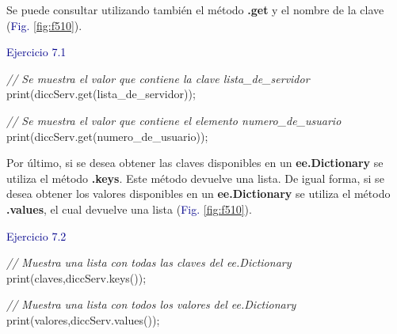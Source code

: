\documentclass[
  12pt,
  letterpaper,
  twoside]{book}
\newenvironment{Shaded}{\begin{snugshade}}{\end{snugshade}}
\newcommand{\CommentTok}[1]{\textcolor[rgb]{0.24,0.58,0.00}{\textit{#1}}}
\newcommand{\FunctionTok}[1]{\textcolor[rgb]{0.48,0.12,0.64}{#1}}
\newcommand{\NormalTok}[1]{#1}
\newcommand{\OperatorTok}[1]{\textcolor[rgb]{0.00,0.00,0.00}{#1}}
\newcommand{\StringTok}[1]{\textcolor[rgb]{0.87,0.29,0.22}{#1}}
\newcommand\boldpurple[1]{\textcolor{darkpurple}{\textbf{#1}}}
\begin{document}
Se puede consultar utilizando también el método \boldpurple{.get} y el nombre de la clave (\textcolor{darkblue}{Fig.} \ref{fig:f510}).

\textcolor{darkblue}{Ejercicio 7.1}

\begin{Shaded}
\begin{Highlighting}[]
\CommentTok{// Se muestra el valor que contiene la clave \textquotesingle{}lista\_de\_servidor\textquotesingle{}}
\FunctionTok{print}\NormalTok{(diccServ}\OperatorTok{.}\FunctionTok{get}\NormalTok{(}\StringTok{\textquotesingle{}lista\_de\_servidor\textquotesingle{}}\NormalTok{))}\OperatorTok{;}

\CommentTok{// Se muestra el valor que contiene el elemento \textquotesingle{}numero\_de\_usuario   }
\FunctionTok{print}\NormalTok{(diccServ}\OperatorTok{.}\FunctionTok{get}\NormalTok{(}\StringTok{\textquotesingle{}numero\_de\_usuario\textquotesingle{}}\NormalTok{))}\OperatorTok{;}        
\end{Highlighting}
\end{Shaded}

Por último, si se desea obtener las claves disponibles en un \boldpurple{ee.Dictionary} se utiliza el método \boldpurple{.keys}. Este método devuelve una lista. De igual forma, si se desea obtener los valores disponibles en un \boldpurple{ee.Dictionary} se utiliza el método \boldpurple{.values}, el cual devuelve una lista (\textcolor{darkblue}{Fig.} \ref{fig:f510}).

\textcolor{darkblue}{Ejercicio 7.2}

\begin{Shaded}
\begin{Highlighting}[]
\CommentTok{// Muestra una lista con todas las claves del ee.Dictionary}
\FunctionTok{print}\NormalTok{(}\StringTok{\textquotesingle{}claves\textquotesingle{}}\OperatorTok{,}\NormalTok{diccServ}\OperatorTok{.}\FunctionTok{keys}\NormalTok{())}\OperatorTok{;}    

\CommentTok{// Muestra una lista con todos los valores del ee.Dictionary}
\FunctionTok{print}\NormalTok{(}\StringTok{\textquotesingle{}valores\textquotesingle{}}\OperatorTok{,}\NormalTok{diccServ}\OperatorTok{.}\FunctionTok{values}\NormalTok{())}\OperatorTok{;}  
\end{Highlighting}
\end{Shaded}
\end{document}
